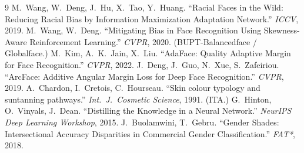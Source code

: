 \documentclass[10pt,twocolumn]{article}
\begin{document}
\begin{thebibliography}{9}
\small
{} M.\ Wang, W.\ Deng, J.\ Hu, X.\ Tao, Y.\ Huang.
``Racial Faces in the Wild: Reducing Racial Bias by Information Maximization
Adaptation Network.'' \emph{ICCV}, 2019.
 M.\ Wang, W.\ Deng. ``Mitigating Bias in Face Recognition Using
Skewness-Aware Reinforcement Learning.'' \emph{CVPR}, 2020.
(BUPT-Balancedface / Globalface.)
 M.\ Kim, A.\ K.\ Jain, X.\ Liu. ``AdaFace: Quality Adaptive
Margin for Face Recognition.'' \emph{CVPR}, 2022.
 J.\ Deng, J.\ Guo, N.\ Xue, S.\ Zafeiriou. ``ArcFace: Additive
Angular Margin Loss for Deep Face Recognition.'' \emph{CVPR}, 2019.
 A.\ Chardon, I.\ Cretois, C.\ Hourseau. ``Skin colour typology and
suntanning pathways.'' \emph{Int.\ J.\ Cosmetic Science}, 1991. (ITA.)
 G.\ Hinton, O.\ Vinyals, J.\ Dean. ``Distilling the Knowledge in a
Neural Network.'' \emph{NeurIPS Deep Learning Workshop}, 2015.
 J.\ Buolamwini, T.\ Gebru. ``Gender Shades:
Intersectional Accuracy Disparities in Commercial Gender Classification.''
\emph{FAT*}, 2018.
\end{thebibliography}
\end{document}
